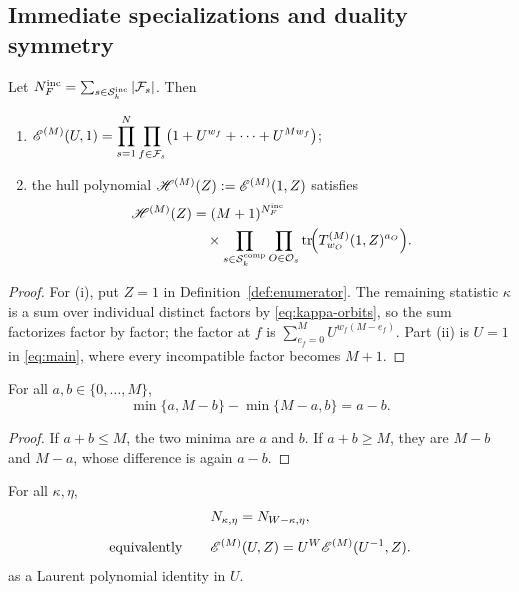 \subsection{Immediate specializations and duality symmetry}
\label{sec:specialisations}

\begin{corollary}\label{cor:marginals}
Let $N_F^{\mathrm{inc}}=\sum_{s\in\mathcal{S}_k^{\mathrm{inc}}}|\mathcal F_s|$.  Then
\begin{enumerate}
\item[\textup{(i)}]
$\displaystyle
\mathscr E^{(M)}(U,1)
 =\prod_{s=1}^{N}\prod_{f\in\mathcal F_s}
   \bigl(1+U^{w_f}+\cdots+U^{Mw_f}\bigr)$;
\item[\textup{(ii)}] the hull polynomial
$\mathscr{H}^{(M)}(Z):=\mathscr E^{(M)}(1,Z)$ satisfies
\[
\begin{aligned}
\mathscr{H}^{(M)}(Z)
&=(M+1)^{N_F^{\mathrm{inc}}}\\
&\quad\times
\prod_{s\in\mathcal{S}_k^{\mathrm{comp}}}
\prod_{O\in\mathcal O_s}
\operatorname{tr}\!\Bigl(
T^{(M)}_{w_O}(1,Z)^{a_O}
\Bigr).
\end{aligned}
\]
\end{enumerate}
\end{corollary}

\begin{proof}
For (i), put $Z=1$ in Definition~\ref{def:enumerator}.  The remaining statistic
$\kappa$ is a sum over individual distinct factors by
\eqref{eq:kappa-orbits}, so the sum factorizes factor by factor; the factor at
$f$ is $\sum_{e_f=0}^{M}U^{w_f(M-e_f)}$.  Part (ii) is $U=1$ in
\eqref{eq:main}, where every incompatible factor becomes $M+1$.
\end{proof}

\begin{lemma}\label{lem:telescoping}
For all $a,b\in\{0,\ldots,M\}$,
\[
\min\{a,M-b\}-\min\{M-a,b\}=a-b.
\]
\end{lemma}

\begin{proof}
If $a+b\leq M$, the two minima are $a$ and $b$.  If $a+b\geq M$, they are
$M-b$ and $M-a$, whose difference is again $a-b$.
\end{proof}

\begin{corollary}\label{cor:symmetry}
For all $\kappa,\eta$,
\[
\begin{gathered}
N_{\kappa,\eta}=N_{W-\kappa,\eta},\\[5pt]
\text{equivalently}\qquad
\mathscr E^{(M)}(U,Z)
=U^W\mathscr E^{(M)}(U^{-1},Z).
\end{gathered}
\]
as a Laurent polynomial identity in $U$.
\end{corollary}


